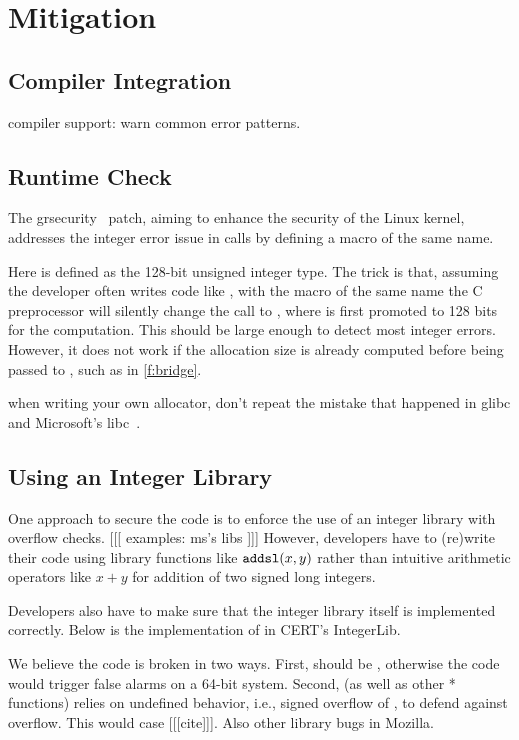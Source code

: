 \section{Mitigation}
\label{s:miti}

\subsection{Compiler Integration}

compiler support: warn common error patterns.

\subsection{Runtime Check}

The grsecurity~\cite{grsecurity} patch, aiming to enhance the
security of the Linux kernel, addresses the integer error issue
in  calls by defining a macro of the same name.
%

%
Here  is defined as the 128-bit unsigned integer
type.  The trick is that, assuming the developer often writes code
like , with the macro of the same name
the C preprocessor will silently change the call to
, where  is first
promoted to 128 bits for the computation.  This should be large
enough to detect most integer errors.  However, it does not work
if the allocation size is already computed before being passed to
, such as in \autoref{f:bridge}.

when writing your own allocator, don't repeat the mistake that
happened in glibc and Microsoft's libc~\cite{rus-cert:calloc}.

\subsection{Using an Integer Library}

One approach to secure the code is to enforce the use of an integer library
with overflow checks. [[[ examples: ms's libs ]]]
However, developers have to (re)write their
code using library functions like $\texttt{addsl}(x, y)$ rather than
intuitive arithmetic operators like $x + y$ for addition of two signed
long integers.

Developers also have to make sure that the integer library itself
is implemented correctly.  Below is the implementation of 
in CERT's IntegerLib.
%

%
We believe the code is broken in two ways. First, 
should be , otherwise the code would
trigger false alarms on a 64-bit system.  Second, 
(as well as other * functions)
relies on undefined behavior, i.e., signed overflow of ,
to defend against overflow.  This would case [[[cite]]].  Also other
library bugs in Mozilla.

